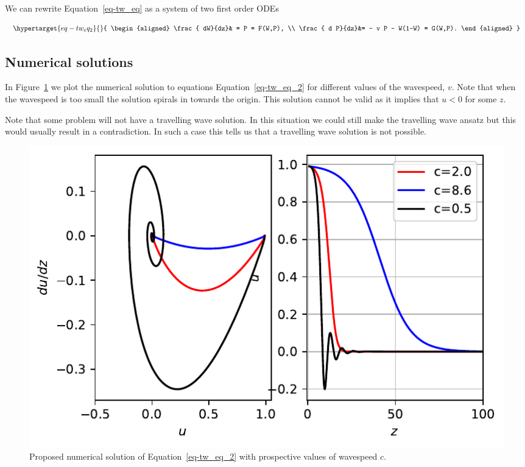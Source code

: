 \documentclass[
  letterpaper,
  DIV=11,
  numbers=noendperiod]{scrreprt}
\theoremstyle{definition}
\theoremstyle{plain}
\theoremstyle{plain}
\theoremstyle{remark}
\begin{document}
We can rewrite Equation~\ref{eq-tw_eq} as a system of two first order
ODEs

\begin{equation}\protect\hypertarget{eq-tw_eq_2}{}{
\begin{aligned}
\frac{ dW}{dz}& = P  = F(W,P), \\
\frac{ d P}{dz}&= -  v P - W(1-W)  = G(W,P).  
\end{aligned}
}\label{eq-tw_eq_2}\end{equation}

\hypertarget{numerical-solutions-1}{%
\subsection{Numerical solutions}\label{numerical-solutions-1}}

In Figure~\ref{fig-fishernumtravwave} we plot the numerical solution to
equations Equation~\ref{eq-tw_eq_2} for different values of the
wavespeed, \(v\). Note that when the wavespeed is too small the solution
spirals in towards the origin. This solution cannot be valid as it
implies that \(u<0\) for some \(z\).

Note that some problem will not have a travelling wave solution. In this
situation we could still make the travelling wave ansatz but this would
usually result in a contradiction. In such a case this tells us that a
travelling wave solution is not possible.

\begin{figure}

{\centering \includegraphics{nonlinearreactiondiffusion_files/figure-pdf/fig-fishernumtravwave-output-1.pdf}

}

\caption{\label{fig-fishernumtravwave}Proposed numerical solution of
Equation~\ref{eq-tw_eq_2} with prospective values of wavespeed \(c\).}

\end{figure}
\end{document}

